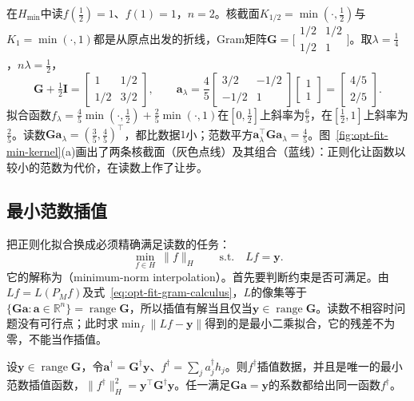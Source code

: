 \begin{example}[最小值核上的两点拟合]
\label{ex:opt-fit-min-kernel}
在$H_{\min}$中读$f(\tfrac12)=1$、$f(1)=1$，$n=2$。核截面$K_{1/2}=\min(\cdot,\tfrac12)$与$K_1=\min(\cdot,1)$都是从原点出发的折线，Gram矩阵$\bm G=\bigl[\begin{smallmatrix}1/2&1/2\\1/2&1\end{smallmatrix}\bigr]$。取$\lambda=\tfrac14$，$n\lambda=\tfrac12$，
\[
  \bm G+\tfrac12\bm I=\begin{bmatrix}1&1/2\\1/2&3/2\end{bmatrix},\qquad
  \bm a_\lambda=\frac45\begin{bmatrix}3/2&-1/2\\-1/2&1\end{bmatrix}\begin{bmatrix}1\\1\end{bmatrix}=\begin{bmatrix}4/5\\2/5\end{bmatrix}.
\]
拟合函数$f_\lambda=\tfrac45\min(\cdot,\tfrac12)+\tfrac25\min(\cdot,1)$在$[0,\tfrac12]$上斜率为$\tfrac65$，在$[\tfrac12,1]$上斜率为$\tfrac25$。读数$\bm G\bm a_\lambda=(\tfrac35,\tfrac45)^\top$，都比数据$1$小；范数平方$\bm a_\lambda^\top\bm G\bm a_\lambda=\tfrac45$。图~\ref{fig:opt-fit-min-kernel}(a)画出了两条核截面（灰色点线）及其组合（蓝线）：正则化让函数以较小的范数为代价，在读数上作了让步。
\end{example}

\subsection{最小范数插值}
\label{sec:opt-fit-min-norm-interpolation}

把正则化拟合换成必须精确满足读数的任务：
\[
  \min_{f\in H}\ \|f\|_H\qquad\text{s.t.}\quad Lf=\bm y .
\]
它的解称为（minimum-norm interpolation）。首先要判断约束是否可满足。由$Lf=L(P_Mf)$及式~\eqref{eq:opt-fit-gram-calculus}，$L$的像集等于$\{\bm G\bm a:\bm a\in\mathbb R^n\}=\operatorname{range}\bm G$，所以插值有解当且仅当$\bm y\in\operatorname{range}\bm G$。读数不相容时问题没有可行点；此时求$\min_f\|Lf-\bm y\|$得到的是最小二乘拟合，它的残差不为零，不能当作插值。

\begin{theorem}[最小范数插值]
\label{thm:opt-fit-min-norm-interpolation}
设$\bm y\in\operatorname{range}\bm G$，令$\bm a^\dagger=\bm G^\dagger\bm y$、$f^\dagger=\sum_ja^\dagger_jh_j$。则$f^\dagger$插值数据，并且是唯一的最小范数插值函数，$\|f^\dagger\|_H^2=\bm y^\top\bm G^\dagger\bm y$。任一满足$\bm G\bm a=\bm y$的系数都给出同一函数$f^\dagger$。
\end{theorem}

